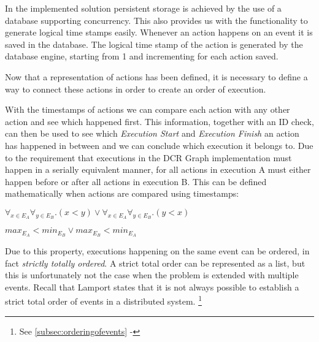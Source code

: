 	\newpar In the implemented solution persistent storage is achieved by the use of a database supporting concurrency. This also provides us with the functionality to generate logical time stamps easily. Whenever an action happens on an event it is saved in the database. The logical time stamp of the action is generated by the database engine, starting from 1 and incrementing for each action saved.
	
	\newpar Now that a representation of actions has been defined, it is necessary to define a way to connect these actions in order to create an order of execution. 
	
	\newpar With the timestamps of actions we can compare each action with any other action and see which happened first. This information, together with an ID check, can then be used to see which \textit{Execution Start} and \textit{Execution Finish} an action has happened in between and we can conclude which execution it belongs to. Due to the requirement that executions in the DCR Graph implementation must happen in a serially equivalent manner, for all actions in execution A must either happen before or after all actions in execution B. This can be defined mathematically when actions are compared using timestamps:
	
	\begin{center}
		$\forall_{x \in E_A}\forall_{y \in E_B} . (x < y) \lor \forall_{x \in E_A}\forall_{y \in E_B} . (y < x)$ 
	\end{center}

	\begin{center}
		$max_{E_A} < min_{E_B} \lor max_{E_B} < min_{E_A}$
	\end{center}
	
	\newpar Due to this property, executions happening on the same event can be ordered, in fact \textit{strictly totally ordered}. A strict total order can be represented as a list, but this is unfortunately not the case when the problem is extended with multiple events. Recall that Lamport states  that it is not always possible to establish a strict total order of events in a distributed system. \footnote{See \autoref{subsec:orderingofevents} - } 
	
